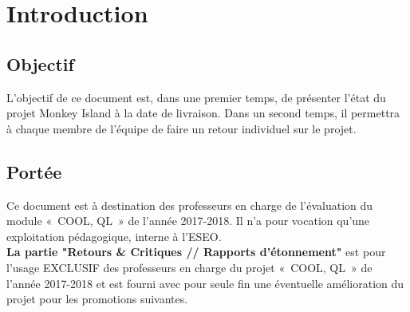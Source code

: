 %

\section{Introduction}
\label{sec:introduction}

\subsection{Objectif}
\label{subsec:introduction:objectif}

L'objectif de ce document est, dans une premier temps, de présenter l'état du projet Monkey Island à la date de livraison. Dans un second temps, il permettra à chaque membre de l'équipe de faire un retour individuel sur le projet.

\subsection{Portée}
\label{subsec:introduction:portee}

Ce document est à destination des professeurs en charge de l'évaluation du module «~COOL, QL~» de l'année 2017-2018. Il n'a pour vocation qu'une exploitation pédagogique, interne à l'ESEO.\\
\textbf{La partie "Retours \& Critiques // Rapports d’étonnement"} est pour l'usage EXCLUSIF des professeurs en charge du projet «~COOL, QL~» de l'année 2017-2018 et est fourni avec pour seule fin une éventuelle amélioration du projet pour les promotions suivantes.


